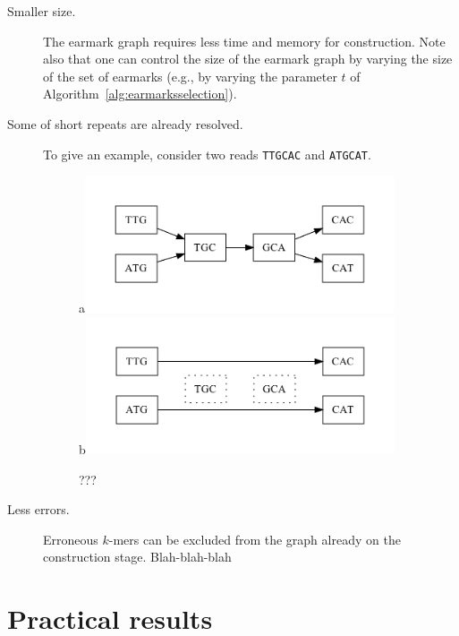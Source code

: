 \documentclass[17pt]{extarticle}
\theoremstyle{definition}
\begin{document}
\begin{multicols}{2}
\begin{description}
\item[Smaller size.]
The earmark graph requires less time and memory for construction.
Note also that one can control the size of the earmark graph 
by varying the size of the set of earmarks (e.g., by varying the parameter $t$
of Algorithm~\ref{alg:earmarksselection}).
\item[Some of short repeats are already resolved.]
To give an example, consider two reads {\tt TTGCAC} and {\tt ATGCAT}.

\begin{figure}
\caption{???}\label{fig:repeatexample}
\begin{center}
a\includegraphics[width=0.9\textwidth]{fig6_de.pdf}\\
b\includegraphics[width=0.9\textwidth]{fig6_ear.pdf}\\
\end{center}
\end{figure}

\item[Less errors.] Erroneous $k$-mers can be excluded from the graph already on
the construction stage.
Blah-blah-blah
\end{description}

\section{Practical results}


\end{multicols}
\end{document}
